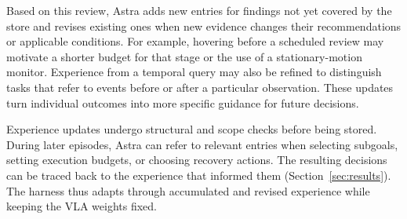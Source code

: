 Based on this review, Astra adds new entries for findings not yet covered by the store and revises existing ones when new evidence changes their recommendations or applicable conditions. For example, hovering before a scheduled review may motivate a shorter budget for that stage or the use of a stationary-motion monitor. Experience from a temporal query may also be refined to distinguish tasks that refer to events before or after a particular observation. These updates turn individual outcomes into more specific guidance for future decisions.

Experience updates undergo structural and scope checks before being stored. During later episodes, Astra can refer to relevant entries when selecting subgoals, setting execution budgets, or choosing recovery actions. The resulting decisions can be traced back to the experience that informed them (Section~\ref{sec:results}). The harness thus adapts through accumulated and revised experience while keeping the VLA weights fixed.





